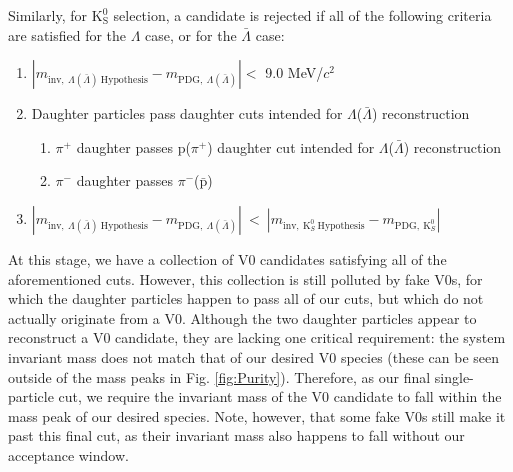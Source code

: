 \documentclass[ALICE,manyauthors]{cernphprep}
\newcommand{\Lam}{$\Lambda$\xspace}
\newcommand{\ALam}{$\bar{\Lambda}$\xspace}
\newcommand{\LamALam}{$\Lambda$($\bar{\Lambda}$)\xspace}
\newcommand{\Ks}{$\mathrm{K^{0}_{S}}$\xspace}
\begin{document}
Similarly, for \Ks selection, a candidate is rejected if all of the following criteria are satisfied for the \Lam case, or for the \ALam case:

\begin{enumerate}
 \item $\left|m_{\mathrm{inv}, \ \Lambda(\bar{\Lambda}) \ \mathrm{Hypothesis}} - m_{\mathrm{PDG},\ \Lambda(\bar{\Lambda})}\right| < $ 9.0 MeV/$c^{2}$
 \item Daughter particles pass daughter cuts intended for \LamALam reconstruction
 \begin{enumerate}
  \item $\pi^{+}$ daughter passes p($\pi^{+}$) daughter cut intended for \LamALam reconstruction
  \item $\pi^{-}$ daughter passes $\pi^{-}$($\bar{\mathrm{p}}$)
 \end{enumerate}
 \item $\left|m_{\mathrm{inv}, \ \Lambda(\bar{\Lambda}) \ \mathrm{Hypothesis}} - m_{\mathrm{PDG},\ \Lambda(\bar{\Lambda})}\right|~ < ~\left|m_{\mathrm{inv},~ \mathrm{K}^{0}_{S}~ \mathrm{Hypothesis}} - m_{\mathrm{PDG},~ \mathrm{K}^{0}_{S}}\right|$
\end{enumerate} 

At this stage, we have a collection of V0 candidates satisfying all of the aforementioned cuts.
However, this collection is still polluted by fake V0s, for which the daughter particles happen to pass all of our cuts, but which do not actually originate from a V0.
Although the two daughter particles appear to reconstruct a V0 candidate, they are lacking one critical requirement: the system invariant mass does not match that of our desired V0 species (these can be seen outside of the mass peaks in Fig. \ref{fig:Purity}).
Therefore, as our final single-particle cut, we require the invariant mass of the V0 candidate to fall within the mass peak of our desired species.
Note, however, that some fake V0s still make it past this final cut, as their invariant mass also happens to fall without our acceptance window.
\end{document}

